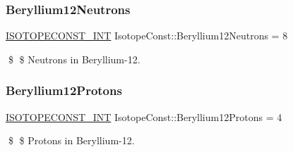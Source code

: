 \subsubsection{\texorpdfstring{Beryllium12\+Neutrons}{Beryllium12Neutrons}}
{\footnotesize\ttfamily \mbox{\hyperlink{group___isotope_const-_macros_ga5f18360b3e99483a35c32d789e62621c}{I\+S\+O\+T\+O\+P\+E\+C\+O\+N\+S\+T\+\_\+\+I\+NT}} Isotope\+Const\+::\+Beryllium12\+Neutrons = 8}

\$ \$ Neutrons in Beryllium-\/12. \mbox{\label{group___isotope_const-_beryllium-_be12_gacff3fb429b6ae17c7fd5293fc8c9eb8c}} 
\subsubsection{\texorpdfstring{Beryllium12\+Protons}{Beryllium12Protons}}
{\footnotesize\ttfamily \mbox{\hyperlink{group___isotope_const-_macros_ga5f18360b3e99483a35c32d789e62621c}{I\+S\+O\+T\+O\+P\+E\+C\+O\+N\+S\+T\+\_\+\+I\+NT}} Isotope\+Const\+::\+Beryllium12\+Protons = 4}

\$ \$ Protons in Beryllium-\/12. 